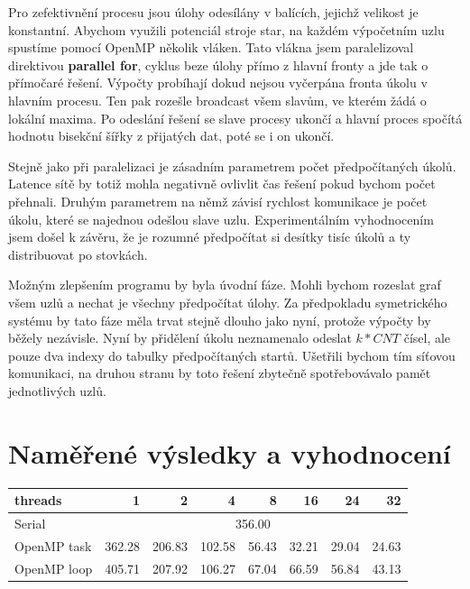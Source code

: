 \documentclass{article}
\begin{document}
Pro zefektivnění procesu jsou úlohy odesílány v balících, jejichž velikost je konstantní. Abychom využili potenciál stroje star, na každém výpočetním uzlu spustíme pomocí OpenMP několik vláken. Tato vlákna jsem paralelizoval direktivou \textbf{parallel for}, cyklus beze úlohy přímo z hlavní fronty a jde tak o přímočaré řešení. Výpočty probíhají dokud nejsou vyčerpána fronta úkolu v hlavním procesu. Ten pak rozešle broadcast všem slavům, ve kterém žádá o lokální maxima. Po odeslání řešení se slave procesy ukončí a hlavní proces spočítá hodnotu bisekční šířky z přijatých dat, poté se i on ukončí.

Stejně jako při paralelizaci je zásadním parametrem počet předpočítaných úkolů. Latence sítě by totiž mohla negativně ovlivlit čas řešení pokud bychom počet přehnali. Druhým parametrem na němž závisí rychlost komunikace je počet úkolu, které se najednou odešlou slave uzlu. Experimentálním vyhodnocením jsem došel k závěru, že je rozumné předpočítat si desítky tisíc úkolů a ty distribuovat po stovkách.

Možným zlepšením programu by byla úvodní fáze. Mohli bychom rozeslat graf všem uzlů a nechat je všechny předpočítat úlohy. Za předpokladu symetrického systému by tato fáze měla trvat stejně dlouho jako nyní, protože výpočty by běžely nezávisle. Nyní by přidělení úkolu neznamenalo odeslat $k*CNT$ čísel, ale pouze dva indexy do tabulky předpočítaných startů. Ušetřili bychom tím síťovou komunikaci, na druhou stranu by toto řešení zbytečně spotřebovávalo pamět jednotlivých uzlů.

\newcommand{\mc}[1]{\multicolumn{2}{r|}{#1}}
\section{Naměřené výsledky a vyhodnocení}

\begin{center}
\begin{tabular}{l|rrrrrrr}
	threads	& 1 & 2 & 4 & 8 & 16 & 24 & 32  \\ 
	\hline
	Serial 		& \multicolumn{7}{c}{356.00} \\ 
	OpenMP task & 362.28 & 206.83 & 102.58 & 56.43 & 32.21 & 29.04 & 24.63 \\ 
	OpenMP loop & 405.71 & 207.92 & 106.27 & 67.04 & 66.59 & 56.84 & 43.13 \\
\end{tabular} 
	\label{table:parallel1}
\end{center}
\end{document}
